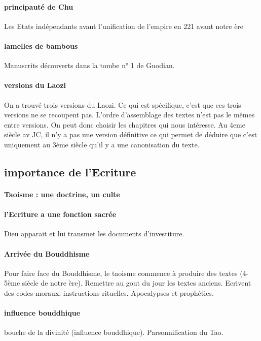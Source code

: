 \paragraph{principauté de Chu} 
   
 
Les Etats indépendants avant l’unification de l’empire en 221 avant notre ère
  
\paragraph{lamelles de bambous} Manuscrits découverts dans la tombe n° 1 de Guodian. 

\paragraph{versions du Laozi}On a trouvé trois versions du Laozi. Ce qui est spécifique, c'est que ces trois versions ne se recoupent pas. L'ordre d'assemblage des textes n'est pas le mêmes entre versions. On peut donc choisir les chapitres qui nous intéresse. Au 4eme siècle av JC, il n'y a pas une version définitive ce qui permet de déduire que c'est uniquement au 3ème siècle qu'il y a une canonisation du texte.


\subsection{importance de l'Ecriture}

 
\paragraph{Taoisme : une doctrine, un culte}

\paragraph{l'Ecriture a une fonction sacrée} Dieu apparait et lui transmet les documents d'investiture. 

\paragraph{Arrivée du Bouddhisme} Pour faire face du Bouddhisme, le taoisme commence à produire des textes (4-5ème siècle de notre ère). Remettre au gout du jour les textes anciens. Ecrivent des codes moraux, instructions rituelles. Apocalypses et prophéties. 

\paragraph{influence bouddhique} bouche de la divinité (influence bouddhique).  Parsonnification du Tao. 

